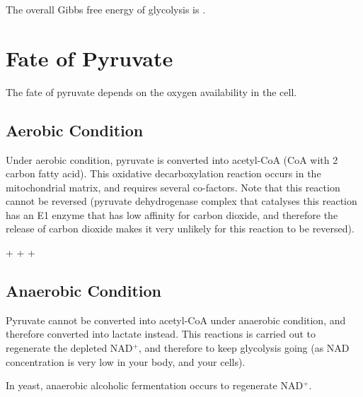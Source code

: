 The overall Gibbs free energy of glycolysis is .

\section{Fate of Pyruvate}

The fate of pyruvate depends on the oxygen availability in the cell.

\subsection{Aerobic Condition}

Under aerobic condition, pyruvate is converted into acetyl-CoA (CoA with 2 carbon fatty acid).
This oxidative decarboxylation reaction occurs in the mitochondrial matrix, and requires several co-factors.
Note that this reaction cannot be reversed (pyruvate dehydrogenase complex that catalyses this reaction has an E1 enzyme that has low affinity for carbon dioxide, and therefore the release of carbon dioxide makes it very unlikely for this reaction to be reversed).

\begin{center}
\setatomsep{2em}
 +
 +  \ch{->}
 + 
\end{center}

\subsection{Anaerobic Condition}

Pyruvate cannot be converted into acetyl-CoA under anaerobic condition, and therefore converted into lactate instead.
This reactions is carried out to regenerate the depleted NAD$^+$, and therefore to keep glycolysis going (as NAD concentration is very low in your body, and your cells).

\begin{center}
\end{center}

In yeast, anaerobic alcoholic fermentation occurs to regenerate NAD$^+$.


















